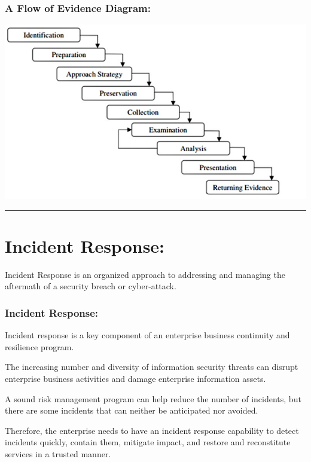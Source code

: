 \documentclass[british]{article}
\begin{document}
\section{A Flow of Evidence Diagram:}
\begin{center}
\includegraphics[scale=0.5]{Pictures/DF} 
\par\end{center}

\rule[0.5ex]{0.75\columnwidth}{1pt}

\part{Incident Response:}

Incident Response is an organized approach to addressing and managing
the aftermath of a security breach or cyber-attack.

\section{Incident Response:}

Incident response is a key component of an enterprise business continuity
and resilience program.

The increasing number and diversity of information security threats
can disrupt enterprise business activities and damage enterprise information
assets.

A sound risk management program can help reduce the number of incidents,
but there are some incidents that can neither be anticipated nor avoided.

Therefore, the enterprise needs to have an incident response capability
to detect incidents quickly, contain them, mitigate impact, and restore
and reconstitute services in a trusted manner.
\end{document}
